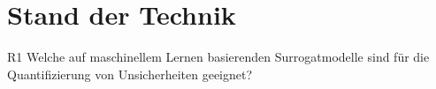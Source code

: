 
\chapter{Stand der Technik}
\label{chapter:stand-der-technik}

\begin{otherlanguage}{american}
%
%
%
\end{otherlanguage}


\begin{otherlanguage}{ngerman}

R1 Welche auf maschinellem Lernen basierenden Surrogatmodelle sind für die Quantifizierung von Unsicherheiten geeignet?


\end{otherlanguage}
